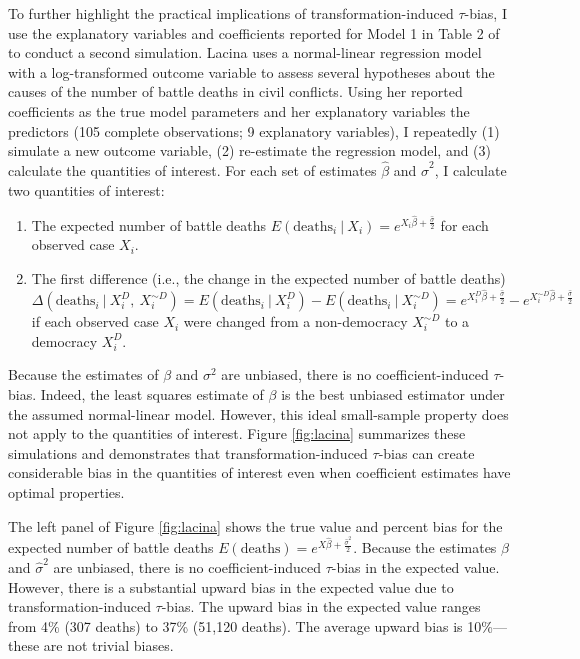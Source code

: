 \documentclass[12pt]{article}
\begin{document}
To further highlight the practical implications of transformation-induced $\tau$-bias, I use the explanatory variables and coefficients reported for Model 1 in Table 2 of \citet[p. 286]{Lacina2006} to conduct a second simulation. 
Lacina uses a normal-linear regression model with a log-transformed outcome variable to assess several hypotheses about the causes of the number of battle deaths in civil conflicts.
Using her reported coefficients as the true model parameters and her explanatory variables the predictors (105 complete observations; 9 explanatory variables), I repeatedly (1) simulate a new outcome variable, (2) re-estimate the regression model, and (3) calculate the quantities of interest.
For each set of estimates $\hat{\beta}$ and $\hat{\sigma}^2$, I calculate two quantities of interest:
\begin{enumerate}
\item The expected number of battle deaths $E(\text{deaths}_i~|~X_i) = e^{X_i\hat{\beta} + \frac{\hat{\sigma}}{2}}$ for each observed case $X_i$.
\item The first difference (i.e., the change in the expected number of battle deaths) $\Delta(\text{deaths}_i~|~X^{D}_i,~ X^{\sim D}_i)  = E(\text{deaths}_i~|~X^{D}_i) - E(\text{deaths}_i~|~X^{\sim D}_i) =  e^{X_i^{D}\hat{\beta} + \frac{\hat{\sigma}}{2}} - e^{X_i^{\sim D}\hat{\beta} + \frac{\hat{\sigma}}{2}}$ if each observed case $X_i$ were changed from a non-democracy $X^{\sim D}_i$ to a democracy $X^{D}_i$.
\end{enumerate}
Because the estimates of $\beta$ and $\sigma^2$ are unbiased, there is no coefficient-induced $\tau$-bias. 
Indeed, the least squares estimate of $\beta$ is the best unbiased estimator under the assumed normal-linear model. 
However, this ideal small-sample property does not apply to the quantities of interest.
Figure \ref{fig:lacina} summarizes these simulations and demonstrates that transformation-induced $\tau$-bias can create considerable bias in the quantities of interest even when coefficient estimates have optimal properties.

The left panel of Figure \ref{fig:lacina} shows the true value and percent bias for the expected number of battle deaths $E(\text{deaths}) = e^{X\hat{\beta} + \frac{\hat{\sigma}^2}{2}}$. 
Because the estimates $\hat{\beta}$ and $\hat{\sigma}^2$ are unbiased, there is no coefficient-induced $\tau$-bias in the expected value.
However, there is a substantial upward bias in the expected value due to transformation-induced $\tau$-bias.
The upward bias in the expected value ranges from 4\% (307 deaths) to 37\% (51,120 deaths).
The average upward bias is 10\%---these are not trivial biases.
\end{document}
